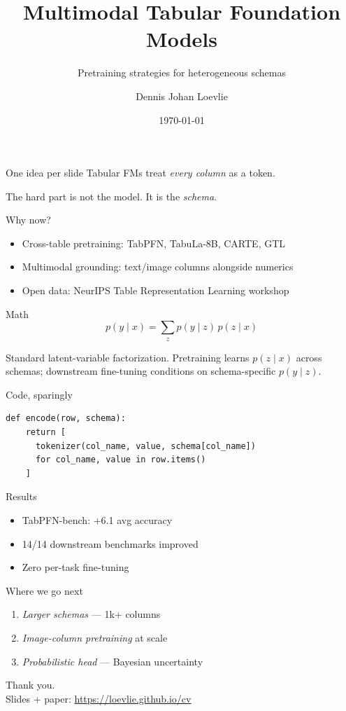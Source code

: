\documentclass[aspectratio=169]{beamer}
\title{Multimodal Tabular Foundation Models}
\subtitle{Pretraining strategies for heterogeneous schemas}
\author{Dennis Johan Loevlie}
\institute{ELLIS PhD \,\textemdash\, CWI \& UvA}
\date{\today}
\begin{document}
\maketitle

\begin{frame}{One idea per slide}
Tabular FMs treat \emph{every column} as a token.

\bigskip

The hard part is not the model. It is the \emph{schema}.
\end{frame}

\begin{frame}{Why now?}
\begin{itemize}
  \item Cross-table pretraining: TabPFN, TabuLa-8B, CARTE, GTL
  \item Multimodal grounding: text/image columns alongside numerics
  \item Open data: NeurIPS Table Representation Learning workshop
\end{itemize}
\end{frame}

\begin{frame}{Math}
\[
  p(y \mid x) = \sum_z p(y \mid z)\,p(z \mid x)
\]

\smallskip

{\small\color{meta}Standard latent-variable factorization. Pretraining learns
$p(z\mid x)$ across schemas; downstream fine-tuning conditions on
schema-specific $p(y \mid z)$.}
\end{frame}

\begin{frame}[fragile]{Code, sparingly}
\begin{verbatim}
def encode(row, schema):
    return [
      tokenizer(col_name, value, schema[col_name])
      for col_name, value in row.items()
    ]
\end{verbatim}
\end{frame}

\begin{frame}{Results}
\begin{itemize}
  \item TabPFN-bench: \alert{+6.1} avg accuracy
  \item 14/14 downstream benchmarks improved
  \item Zero per-task fine-tuning
\end{itemize}
\end{frame}

\begin{frame}{Where we go next}
\begin{enumerate}
  \item \emph{Larger schemas} — 1k+ columns
  \item \emph{Image-column pretraining} at scale
  \item \emph{Probabilistic head} — Bayesian uncertainty
\end{enumerate}
\end{frame}

\begin{frame}[standout]
Thank you.\\[0.6em]
{\small\color{meta}Slides + paper: \url{https://loevlie.github.io/cv}}
\end{frame}
\end{document}
